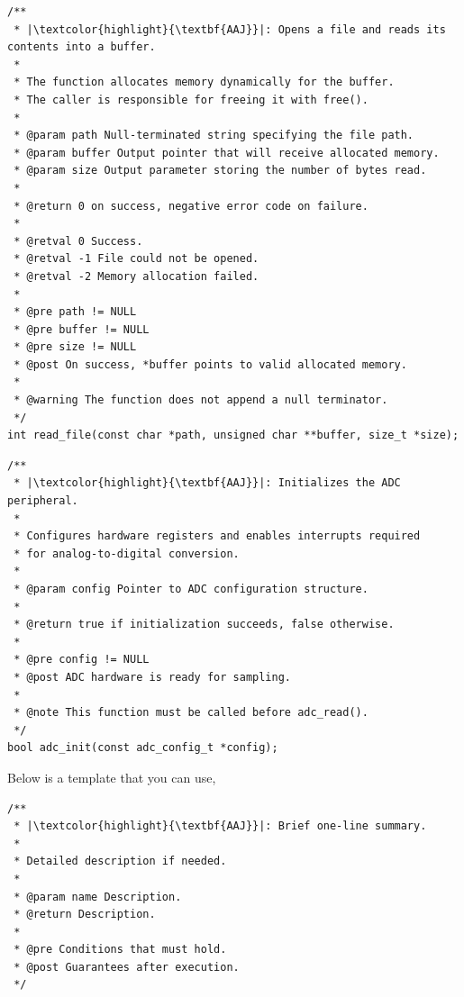 \documentclass[11pt]{article}
\begin{document}
\begin{verbatim}
/**
 * |\textcolor{highlight}{\textbf{AAJ}}|: Opens a file and reads its contents into a buffer.
 *
 * The function allocates memory dynamically for the buffer.
 * The caller is responsible for freeing it with free().
 *
 * @param path Null-terminated string specifying the file path.
 * @param buffer Output pointer that will receive allocated memory.
 * @param size Output parameter storing the number of bytes read.
 *
 * @return 0 on success, negative error code on failure.
 *
 * @retval 0 Success.
 * @retval -1 File could not be opened.
 * @retval -2 Memory allocation failed.
 *
 * @pre path != NULL
 * @pre buffer != NULL
 * @pre size != NULL
 * @post On success, *buffer points to valid allocated memory.
 *
 * @warning The function does not append a null terminator.
 */
int read_file(const char *path, unsigned char **buffer, size_t *size);
\end{verbatim}

\begin{verbatim}
/**
 * |\textcolor{highlight}{\textbf{AAJ}}|: Initializes the ADC peripheral.
 *
 * Configures hardware registers and enables interrupts required
 * for analog-to-digital conversion.
 *
 * @param config Pointer to ADC configuration structure.
 *
 * @return true if initialization succeeds, false otherwise.
 *
 * @pre config != NULL
 * @post ADC hardware is ready for sampling.
 *
 * @note This function must be called before adc_read().
 */
bool adc_init(const adc_config_t *config);
\end{verbatim}


Below is a template that you can use,

\begin{verbatim}
/**
 * |\textcolor{highlight}{\textbf{AAJ}}|: Brief one-line summary.
 *
 * Detailed description if needed.
 *
 * @param name Description.
 * @return Description.
 *
 * @pre Conditions that must hold.
 * @post Guarantees after execution.
 */
\end{verbatim}
\end{document}
